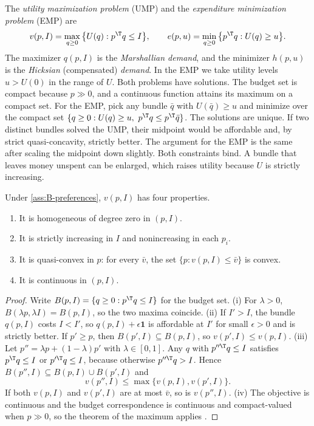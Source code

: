 The \emph{utility maximization problem} (UMP) and the \emph{expenditure minimization problem} (EMP) are
\begin{equation}\label{eq:B-ump-emp}
v(p, I) = \max_{q \geq 0}\big\{U(q) : p^\T q \leq I\big\},
\qquad
e(p, u) = \min_{q \geq 0}\big\{p^\T q : U(q) \geq u\big\}.
\end{equation}
The maximizer $q(p, I)$ is the \emph{Marshallian demand}, and the minimizer $h(p, u)$ is the
\emph{Hicksian} (compensated) \emph{demand}. In the EMP we take utility levels $u > U(0)$ in the range of
$U$. Both problems have solutions. The budget set is compact because $p \gg 0$, and a continuous function
attains its maximum on a compact set. For the EMP, pick any bundle $\bar q$ with $U(\bar q) \geq u$ and
minimize over the compact set $\{q \geq 0 : U(q) \geq u,\ p^\T q \leq p^\T\bar q\}$. The solutions are
unique. If two distinct bundles solved the UMP, their midpoint would be affordable and, by strict
quasi-concavity, strictly better. The argument for the EMP is the same after scaling the midpoint down
slightly. Both constraints bind. A bundle that leaves money unspent can be enlarged, which raises utility
because $U$ is strictly increasing.

\begin{proposition}\label{prop:B-v-properties}
Under \cref{ass:B-preferences}, $v(p, I)$ has four properties.
\begin{enumerate}[label=(\roman*)]
\item It is homogeneous of degree zero in $(p, I)$.
\item It is strictly increasing in $I$ and nonincreasing in each $p_i$.
\item It is quasi-convex in $p$: for every $\bar v$, the set $\{p : v(p, I) \leq \bar v\}$ is convex.
\item It is continuous in $(p, I)$.
\end{enumerate}
\end{proposition}

\begin{proof}
Write $B(p, I) = \{q \geq 0 : p^\T q \leq I\}$ for the budget set. (i) For $\lambda > 0$,
$B(\lambda p, \lambda I) = B(p, I)$, so the two maxima coincide. (ii) If $I' > I$, the bundle $q(p, I)$
costs $I < I'$, so $q(p, I) + \epsilon\mathbf{1}$ is affordable at $I'$ for small $\epsilon > 0$ and is
strictly better. If $p' \geq p$, then $B(p', I) \subseteq B(p, I)$, so $v(p', I) \leq v(p, I)$. (iii) Let
$p'' = \lambda p + (1 - \lambda)p'$ with $\lambda \in [0, 1]$. Any $q$ with $p''^\T q \leq I$ satisfies
$p^\T q \leq I$ or $p'^\T q \leq I$, because otherwise $p''^\T q > I$. Hence
$B(p'', I) \subseteq B(p, I) \cup B(p', I)$ and
\begin{equation*}
v(p'', I) \leq \max\{v(p, I), v(p', I)\}.
\end{equation*}
If both $v(p, I)$ and $v(p', I)$ are at most $\bar v$, so is $v(p'', I)$. (iv) The objective is continuous
and the budget correspondence is continuous and compact-valued when $p \gg 0$, so the theorem of the
maximum applies \citep[ch.~3]{MasColellWhinstonGreen1995}.
\end{proof}

